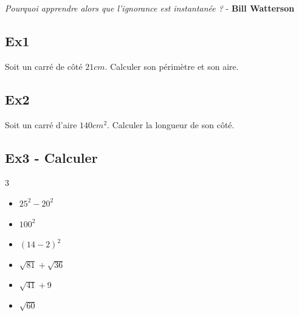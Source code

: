 



\begin{center}
  \textit{Pourquoi apprendre alors que l’ignorance est instantanée ?} - \textbf{Bill Watterson}
\end{center}

\subsection*{Ex1}
Soit un carré de côté $21cm$. Calculer son périmètre et son aire.

\subsection*{Ex2}
Soit un carré d'aire $140cm^2$. Calculer la longueur de son côté.

\subsection*{Ex3 - Calculer}

\begin{multicols}{3}
\begin{itemize}[label={$\bullet$}]
  \item $25^2 - 20^2$
  \item $100^2$
  \item $(14 - 2)^2$
  \item $\sqrt{81} + \sqrt{36}$
  \item $\sqrt{41} + 9$
  \item $\sqrt{60}$
\end{itemize}
\end{multicols}

